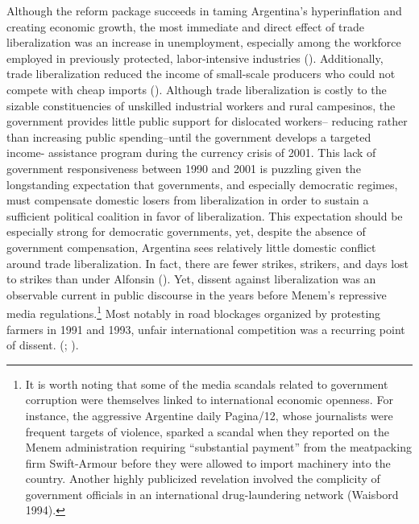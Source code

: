 \documentclass[12pt]{report}
\begin{document}
Although the reform package succeeds in taming Argentina's hyperinflation and creating economic
growth, the most immediate and direct effect of trade liberalization was an increase in
unemployment, especially among the workforce employed in previously protected, labor-intensive
industries (\citealt[10]{Beker:2011vq}). Additionally, trade liberalization reduced the income of
small-scale producers who could not compete with cheap imports (\citealt{eckstein2001power}).
Although trade liberalization is costly to the sizable constituencies of unskilled industrial
workers and rural campesinos, the government provides little public support for dislocated workers--
reducing rather than increasing public spending--until the government develops a targeted income-
assistance program during the currency crisis of 2001. This lack of government responsiveness
between 1990 and 2001 is puzzling given the longstanding expectation that governments, and
especially democratic regimes, must compensate domestic losers from liberalization in order to
sustain a sufficient political coalition in favor of liberalization. This expectation should be
especially strong for democratic governments, yet, despite the absence of government compensation,
Argentina sees relatively little domestic conflict around trade liberalization. In fact, there are
fewer strikes, strikers, and days lost to strikes than under Alfonsin (\citealt{eckstein2001power}).
Yet, dissent against liberalization was an observable current in public discourse in the years
before Menem's repressive media regulations.\footnote{It is worth noting that some of the media
scandals related to government corruption were themselves linked to international economic openness.
For instance, the aggressive Argentine daily Pagina/12, whose journalists were frequent targets of
violence, sparked a scandal when they reported on the Menem administration requiring ``substantial
payment'' from the meatpacking firm Swift-Armour before they were allowed to import machinery into
the country. Another highly publicized revelation involved the complicity of government officials in
an international drug-laundering network (Waisbord 1994).} Most notably in road blockages
organized by protesting farmers in 1991 and 1993, unfair international competition was a recurring
point of dissent. (\citealt{McCullough:1991cs}; \citealt{Ferber:1993fb}).
\end{document}
